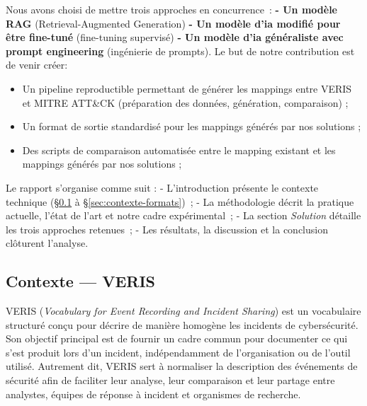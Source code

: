 \documentclass[a4paper,12pt]{article}
\begin{document}
Nous avons choisi de mettre trois approches en concurrence~: \newline
\textbf{- Un modèle RAG} (Retrieval-Augmented Generation)\newline
\textbf{- Un modèle d'ia modifié pour être fine-tuné} (fine-tuning supervisé) \newline
\textbf{- Un modèle d'ia généraliste avec prompt engineering} (ingénierie de prompts).\newline
\newline
Le but de notre contribution est de venir créer:
\begin{itemize}
    \item Un pipeline reproductible permettant de générer les mappings entre VERIS et MITRE ATT\&CK (préparation des données, génération, comparaison) ;
    \item Un format de sortie standardisé pour les mappings générés par nos solutions ;
    \item Des scripts de comparaison automatisée entre le mapping existant et les mappings générés par nos solutions ;
\end{itemize}

Le rapport s'organise comme suit : \newline 
- L'introduction présente le contexte technique (§\ref{sec:contexte-veris} à §\ref{sec:contexte-formats})~; \newline
- La méthodologie décrit la pratique actuelle, l'état de l'art et notre cadre expérimental~; \newline
- La section \emph{Solution} détaille les trois approches retenues~; \newline
- Les résultats, la discussion et la conclusion clôturent l'analyse. \newline

\subsection{Contexte --- VERIS}
\label{sec:contexte-veris}

VERIS (\emph{Vocabulary for Event Recording and Incident Sharing}) est un vocabulaire structuré conçu pour décrire de manière homogène les incidents de cybersécurité. Son objectif principal est de fournir un cadre commun pour documenter ce qui s'est produit lors d'un incident, indépendamment de l'organisation ou de l'outil utilisé. Autrement dit, VERIS sert à normaliser la description des événements de sécurité afin de faciliter leur analyse, leur comparaison et leur partage entre analystes, équipes de réponse à incident et organismes de recherche.
\end{document}
